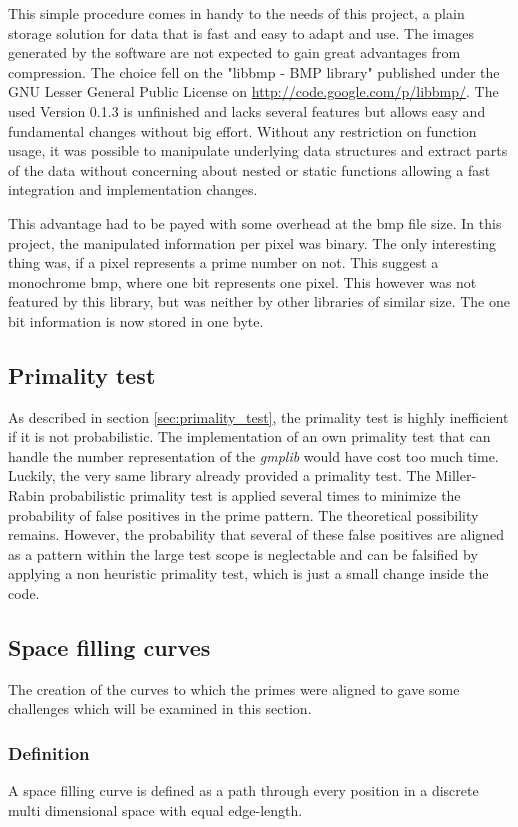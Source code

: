 This simple procedure comes in handy to the needs of this project, a plain storage solution for data that is fast and easy to adapt and use. The images generated by the software are not expected to gain great advantages from compression. The choice fell on the "libbmp - BMP library" published under the GNU Lesser General Public License on \url{http://code.google.com/p/libbmp/}. The used Version 0.1.3 is unfinished and lacks several features but allows easy and fundamental changes without big effort. Without any restriction on function usage, it was possible to manipulate underlying data structures and extract parts of the data without concerning about nested or static functions allowing a fast integration and implementation changes.

This advantage had to be payed with some overhead at the bmp file size. In this project, the manipulated  information per pixel was binary. The only interesting thing was, if a pixel represents a prime number on not. This suggest a monochrome bmp, where one bit represents one pixel. This however was not featured by this library, but was neither by other libraries of similar size. The one bit information is now stored in one byte.

\subsection{Primality test}
\label{sec:prim_test}
As described in section \ref{sec:primality_test}, the primality test is highly inefficient if it is not probabilistic. The implementation of an own primality test that can handle the number representation of the \emph{gmplib} would have cost too much time. Luckily, the very same library already provided a primality test. The Miller-Rabin probabilistic primality test is applied several times to minimize the probability of false positives in the prime pattern. The theoretical possibility remains. However, the probability that several of these false positives are aligned as a pattern within the large test scope is neglectable and can be falsified by applying a non heuristic primality test, which is just a small change inside the code.

\subsection{Space filling curves}
\label{sec:curves}
The creation of the curves to which the primes were aligned to gave some challenges which will be examined in this section.
\subsubsection{Definition}
A space filling curve is defined as a path through every position in a discrete multi dimensional space with equal edge-length.%

